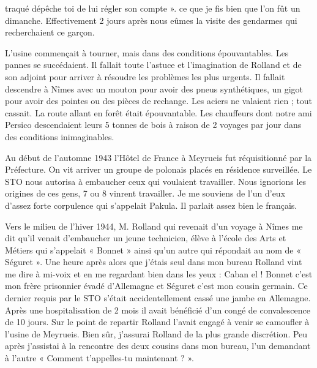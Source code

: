 
traqué dépêche toi de lui régler son compte ». ce que je fis bien que l’on fût un dimanche.
Effectivement 2 jours après nous eûmes la visite des gendarmes qui recherchaient ce garçon.

\vspace{0.45cm}

L’usine commençait à tourner, mais dans des conditions épouvantables. Les pannes se
succédaient. Il fallait toute l’astuce et l’imagination de Rolland et de son adjoint pour arriver à
résoudre les problèmes les plus urgents. Il fallait descendre à Nîmes avec un mouton pour
avoir des pneus synthétiques, un gigot pour avoir des pointes ou des pièces de rechange. Les
aciers ne valaient rien ; tout cassait. La route allant en forêt était épouvantable. Les chauffeurs
dont notre ami Persico descendaient leurs 5 tonnes de bois à raison de 2 voyages par jour dans
des conditions inimaginables.

\vspace{0.45cm}

Au début de l’automne 1943 l’Hôtel de France à Meyrueis fut réquisitionné par la Préfecture.
On vit arriver un groupe de polonais placés en résidence surveillée. Le STO nous autorisa à
embaucher ceux qui voulaient travailler. Nous ignorions les origines de ces gens, 7 ou 8
vinrent travailler. Je me souviens de l’un d’eux d’assez forte corpulence qui s’appelait Pakula.
Il parlait assez bien le français.

\vspace{0.45cm}

Vers le milieu de l’hiver 1944, M. Rolland qui revenait d’un voyage à Nîmes me dit qu’il
venait d’embaucher un jeune technicien, élève à l’école des Arts et Métiers qui s’appelait
« Bonnet » ainsi qu’un autre qui répondait au nom de « Séguret ». Une heure après alors que
j’étais seul dans mon bureau Rolland vint me dire à mi-voix et en me regardant bien dans les
yeux : Caban el ! Bonnet c’est mon frère prisonnier évadé d’Allemagne et Séguret c’est mon
cousin germain. Ce dernier requis par le STO s’était accidentellement cassé une jambe en
Allemagne. Après une hospitalisation de 2 mois il avait bénéficié d’un congé de
convalescence de 10 jours. Sur le point de repartir Rolland l’avait engagé à venir se camoufler
à l’usine de Meyrueis. Bien sûr, j’assurai Rolland de la plus grande discrétion. Peu après
j’assistai à la rencontre des deux cousins dans mon bureau, l’un demandant à l’autre
« Comment t’appelles-tu maintenant ? ».

